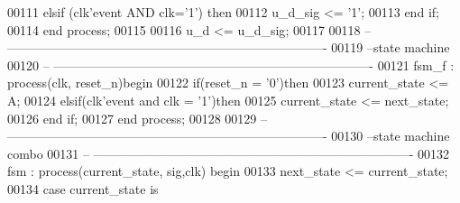 \begin{DoxyCode}
00111    \textcolor{keywordflow}{elsif} \textcolor{vhdlchar}{(}\textcolor{vhdlchar}{clk}\textcolor{vhdlchar}{'}\textcolor{vhdlkeyword}{event} \textcolor{keywordflow}{AND} \textcolor{vhdlchar}{clk}\textcolor{vhdlchar}{=}\textcolor{vhdlchar}{'}\textcolor{vhdllogic}{}\textcolor{vhdllogic}{1}\textcolor{vhdlchar}{'}\textcolor{vhdlchar}{)} \textcolor{keywordflow}{then} 
00112       \textcolor{vhdlchar}{u_d_sig} \textcolor{vhdlchar}{<=} \textcolor{vhdlchar}{'}\textcolor{vhdllogic}{}\textcolor{vhdllogic}{1}\textcolor{vhdlchar}{'};
00113    \textcolor{keywordflow}{end} \textcolor{keywordflow}{if};
00114 \textcolor{keywordflow}{end} \textcolor{keywordflow}{process};
00115 
00116 \textcolor{vhdlchar}{u_d} \textcolor{vhdlchar}{<=} \textcolor{vhdlchar}{u_d_sig};
00117 
00118 \textcolor{keyword}{-- ----------------------------------------------------------------------------}
00119 \textcolor{keyword}{--state machine}
00120 \textcolor{keyword}{-- ----------------------------------------------------------------------------}
00121 fsm\_f : \textcolor{keywordflow}{process}(clk, reset_n)\textcolor{keywordflow}{begin}
00122     \textcolor{keywordflow}{if}\textcolor{vhdlchar}{(}\textcolor{vhdlchar}{reset_n} \textcolor{vhdlchar}{=} \textcolor{vhdlchar}{'}\textcolor{vhdllogic}{}\textcolor{vhdllogic}{0}\textcolor{vhdlchar}{'}\textcolor{vhdlchar}{)}\textcolor{keywordflow}{then}
00123         \textcolor{vhdlchar}{current_state} \textcolor{vhdlchar}{<=} \textcolor{vhdlchar}{A};
00124     \textcolor{keywordflow}{elsif}\textcolor{vhdlchar}{(}\textcolor{vhdlchar}{clk}\textcolor{vhdlchar}{'}\textcolor{vhdlkeyword}{event} \textcolor{keywordflow}{and} \textcolor{vhdlchar}{clk} \textcolor{vhdlchar}{=} \textcolor{vhdlchar}{'}\textcolor{vhdllogic}{}\textcolor{vhdllogic}{1}\textcolor{vhdlchar}{'}\textcolor{vhdlchar}{)}\textcolor{keywordflow}{then} 
00125         \textcolor{vhdlchar}{current_state} \textcolor{vhdlchar}{<=} \textcolor{vhdlchar}{next_state};
00126     \textcolor{keywordflow}{end} \textcolor{keywordflow}{if}; 
00127 \textcolor{keywordflow}{end} \textcolor{keywordflow}{process};
00128 
00129 \textcolor{keyword}{-- ----------------------------------------------------------------------------}
00130 \textcolor{keyword}{--state machine combo}
00131 \textcolor{keyword}{-- ----------------------------------------------------------------------------}
00132 fsm : \textcolor{keywordflow}{process}(current_state, sig,clk) \textcolor{keywordflow}{begin}
00133     \textcolor{vhdlchar}{next_state} \textcolor{vhdlchar}{<=} \textcolor{vhdlchar}{current_state};
00134     \textcolor{keywordflow}{case} \textcolor{vhdlchar}{current_state} \textcolor{keywordflow}{is}

\end{DoxyCode}
